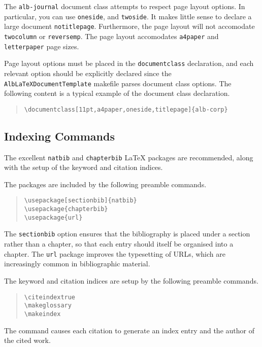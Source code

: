 \documentclass[11pt,a4paper,oneside,titlepage]{alb-corp}
\begin{document}
The \texttt{alb-journal} document class attempts to respect page layout
options.  In particular, you can use \texttt{oneside}, and
\texttt{twoside}.  It makes little sense to declare a large document
\texttt{notitlepage}.  Furthermore, the page layout will not accomodate
\texttt{twocolumn} or \texttt{reversemp}.  The page layout accomodates
\texttt{a4paper} and \texttt{letterpaper} page sizes.

Page layout options must be placed in the \texttt{documentclass}
declaration, and each relevant option should be explicitly declared
since the \texttt{AlbLaTeXDocumentTemplate} makefile parses document
class options.  The following content is a typical example of the
document class declaration.
\begin{quote}
\begin{verbatim}
\documentclass[11pt,a4paper,oneside,titlepage]{alb-corp}
\end{verbatim}
\end{quote}



\subsection{Indexing Commands}
\label{sec:alb-journal-layout-documentation:index-comm}

The excellent \texttt{natbib} and \texttt{chapterbib} \LaTeX{} packages
are recommended, along with the setup of the keyword and citation
indices.

The packages are included by the following preamble commands.
\begin{quote}
\begin{verbatim}
\usepackage[sectionbib]{natbib}
\usepackage{chapterbib}
\usepackage{url}
\end{verbatim}
\end{quote}
The \texttt{sectionbib} option ensures that the bibliography is placed
under a section rather than a chapter, so that each entry should itself
be organised into a chapter.  The \texttt{url} package improves the
typesetting of URLs, which are increasingly common in bibliographic
material.

The keyword and citation indices are setup by the following preamble
commands.
\begin{quote}
\begin{verbatim}
\citeindextrue
\makeglossary
\makeindex
\end{verbatim}
\end{quote}
The  command causes each citation to generate
an index entry and the author of the cited work.
\end{document}
